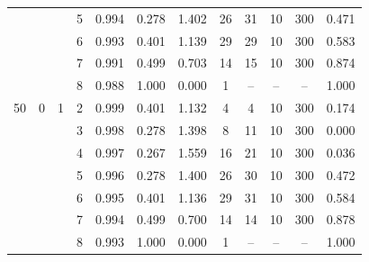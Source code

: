 \documentclass[12pt]{article}
\begin{document}
\begin{table}
\begin{ruledtabular}
\begin{tabular}{cccccccccccc}
 & &  & 5 & 0.994 & 0.278 & 1.402 & 26 & 31 & 10 & 300 & 0.471 \\
 & &  & 6 & 0.993 & 0.401 & 1.139 & 29 & 29 & 10 & 300 & 0.583 \\
 & &  & 7 & 0.991 & 0.499 & 0.703 & 14 & 15 & 10 & 300 & 0.874 \\
 & &  & 8 & 0.988 & 1.000 & 0.000 & 1 & -- & -- & -- & 1.000 \\
\hline
50 & 0 & 1 & 2 & 0.999 & 0.401 & 1.132 & 4 & 4 & 10 & 300 & 0.174 \\
 & &  & 3 & 0.998 & 0.278 & 1.398 & 8 & 11 & 10 & 300 & 0.000 \\
 & &  & 4 & 0.997 & 0.267 & 1.559 & 16 & 21 & 10 & 300 & 0.036 \\
 & &  & 5 & 0.996 & 0.278 & 1.400 & 26 & 30 & 10 & 300 & 0.472 \\
 & &  & 6 & 0.995 & 0.401 & 1.136 & 29 & 31 & 10 & 300 & 0.584 \\
 & &  & 7 & 0.994 & 0.499 & 0.700 & 14 & 14 & 10 & 300 & 0.878 \\
 & &  & 8 & 0.993 & 1.000 & 0.000 & 1 & -- & -- & -- & 1.000
\end{tabular}
\end{ruledtabular}
\end{table}
\end{document}
